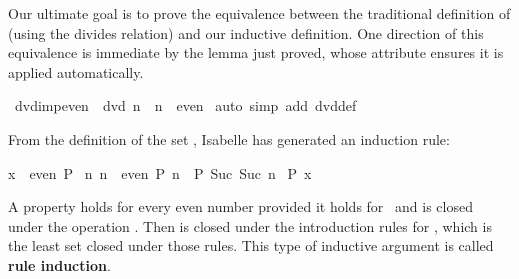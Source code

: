 \begin{isabellebody}
\begin{isamarkuptxt}
Our ultimate goal is to prove the equivalence between the traditional
definition of  (using the divides relation) and our inductive
definition.  One direction of this equivalence is immediate by the lemma
just proved, whose  attribute ensures it is applied automatically.%
\end{isamarkuptxt}%
\isamarkuptrue%
%
\endisatagproof
{\isafoldproof}%
%
\isadelimproof
%
\endisadelimproof
{}\isamarkupfalse%
\ dvd{}imp{}even{}\ {}{}\ dvd\ n\ {}\ n\ {}\ even{}\isanewline
%
\isadelimproof
%
\endisadelimproof
%
\isatagproof
{}\isamarkupfalse%
\ {}auto\ simp\ add{}\ dvd{}def{}%
\endisatagproof
{\isafoldproof}%
%
\isadelimproof
%
\endisadelimproof
%
\isamarkuptrue%
%
\begin{isamarkuptext}%
%
From the definition of the set
, Isabelle has
generated an induction rule:
\begin{isabelle}%
{}x\ {}\ even{}\ P\ {}{}\isanewline
{}n{}\ {}n\ {}\ even{}\ P\ n{}\ {}\ P\ {}Suc\ {}Suc\ n{}{}{}\isanewline
{}\ P\ x%
\end{isabelle}
A property  holds for every even number provided it
holds for~ and is closed under the operation
.  Then  is closed under the introduction
rules for , which is the least set closed under those rules. 
This type of inductive argument is called \textbf{rule induction}. 


\end{isamarkuptext}
\end{isabellebody}
